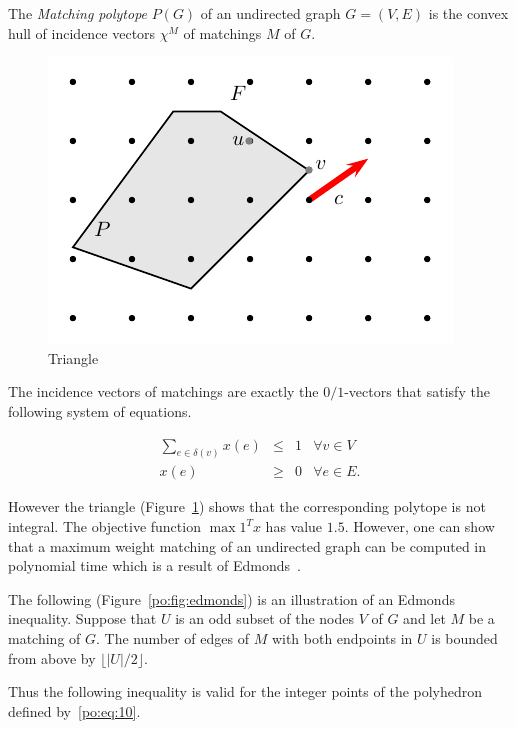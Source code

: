 The \emph{Matching polytope} $P(G)$ of an undirected graph $G = (V,E)$
is the convex hull of incidence vectors  $\chi^M$ of matchings $M$ of
$G$. 


  
\begin{figure}[htbp]
  \centering 
   \includegraphics{figures/PicPolyhedra3.pdf}
  \caption{Triangle}
  \label{po:fig:triangle}
\end{figure}
  

The incidence vectors of matchings are exactly the $0/1$-vectors that
satisfy the following system of equations. 

\begin{equation}
\label{po:eq:10}
  \begin{array}{rcll}
     \sum_{e \in \delta(v)} x(e) & \leq &  1 & \forall v \in V\\
        x(e)& \geq & 0 &    \forall e \in E. 
  \end{array}
\end{equation}

However the triangle (Figure~\ref{po:fig:triangle}) shows that  the
corresponding polytope is not integral. The objective function $\max
\mathrm{1}^Tx$ has value $1.5$. However, one can show that a maximum
weight matching of an undirected graph can be computed in polynomial
time which is a result of Edmonds~\cite{Edmonds65}. 


The following (Figure~\ref{po:fig:edmonds}) is an illustration of an
Edmonds inequality. Suppose that $U$ is an odd subset of the nodes $V$
of $G$ and let $M$ be a matching of $G$. The number of edges of $M$
with both endpoints in $U$ is bounded from above by $\lfloor|U|/2\rfloor$. 

Thus the following inequality is valid for the integer points of the
polyhedron defined by~\eqref{po:eq:10}. 

